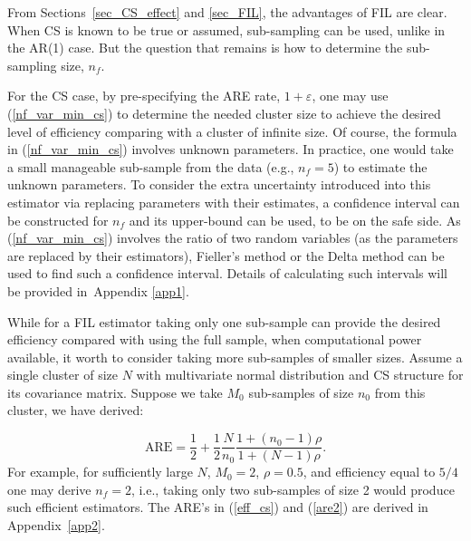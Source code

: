\documentclass[11pt,a5paper,twoside]{book}
\begin{document}
From Sections~\ref{sec_CS_effect} and \ref{sec_FIL}, the advantages of FIL are clear. When CS is known to be true or assumed, sub-sampling can be used, unlike in the AR(1) case.  But the question that remains is how to  determine the sub-sampling size, $n_f$.



For the CS case, by pre-specifying the ARE rate, $1+\varepsilon$, one may use (\ref{nf_var_min_cs}) to determine the needed cluster size to achieve the desired level of efficiency comparing with a cluster of infinite size. Of course, the formula in (\ref{nf_var_min_cs}) involves unknown parameters. In practice, one would take a small manageable sub-sample from the data (e.g., $n_f=5$) to estimate the unknown parameters. To consider the extra uncertainty introduced into this estimator via replacing parameters with their estimates, a confidence interval can be constructed for $n_f$ and its upper-bound can be used, to be on the safe side. As (\ref{nf_var_min_cs}) involves the ratio of two random variables (as the parameters are replaced by their estimators), Fieller's method \cite{fieller1954} or the Delta method can be used to find such a confidence interval. Details of calculating such intervals will be provided in~Appendix \ref{app1}. 
%

While for a FIL estimator taking only one sub-sample can provide the desired efficiency compared with using the full sample, when computational power available, it worth to consider taking more sub-samples of smaller sizes. Assume a single cluster of size $N$ with multivariate normal distribution and CS structure for its covariance matrix. Suppose we take $M_0$ sub-samples of size $n_0$ from this cluster, we have derived:

\begin{equation}
\label{are2}
\mathrm{ARE}= \frac{1}{2} + \frac{1}{2} \frac{N}{n_0} \frac{1+(n_0-1) \rho}{1+ (N-1) \rho}.
\end{equation}
For example, for sufficiently large $N$, $M_0=2$, $\rho=0.5$, and efficiency equal to $5/4$ one may derive $n_f=2$, i.e., taking only two sub-samples of size 2 would produce such efficient estimators. The ARE's in (\ref{eff_cs}) and (\ref{are2}) are derived in Appendix~\ref{app2}.
\end{document}

